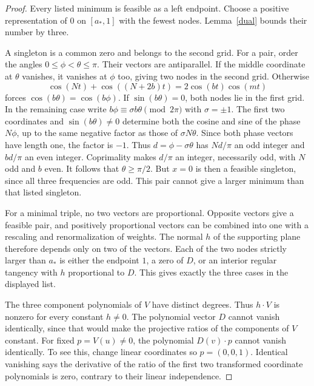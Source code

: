 \documentclass[10pt]{article}
\begin{document}
\begin{proof}
Every listed minimum is feasible as a left endpoint. Choose a positive representation of $0$ on $[a_*,1]$ with the fewest nodes. Lemma~\ref{dual} bounds their number by three.

A singleton is a common zero and belongs to the second grid. For a pair, order the angles $0\le\phi<\theta\le\pi$. Their vectors are antiparallel. If the middle coordinate at $\theta$ vanishes, it vanishes at $\phi$ too, giving two nodes in the second grid. Otherwise
\[
 \cos(Nt)+\cos((N+2b)t)=2\cos(bt)\cos(mt)
\]
forces $\cos(b\theta)=\cos(b\phi)$. If $\sin(b\theta)=0$, both nodes lie in the first grid. In the remaining case write $b\phi\equiv\sigma b\theta\pmod{2\pi}$ with $\sigma=\pm1$. The first two coordinates and $\sin(b\theta)\ne0$ determine both the cosine and sine of the phase $N\phi$, up to the same negative factor as those of $\sigma N\theta$. Since both phase vectors have length one, the factor is $-1$. Thus $d=\phi-\sigma\theta$ has $Nd/\pi$ an odd integer and $bd/\pi$ an even integer. Coprimality makes $d/\pi$ an integer, necessarily odd, with $N$ odd and $b$ even. It follows that $\theta\ge\pi/2$. But $x=0$ is then a feasible singleton, since all three frequencies are odd. This pair cannot give a larger minimum than that listed singleton.

For a minimal triple, no two vectors are proportional. Opposite vectors give a feasible pair, and positively proportional vectors can be combined into one with a rescaling and renormalization of weights. The normal $h$ of the supporting plane therefore depends only on two of the vectors. Each of the two nodes strictly larger than $a_*$ is either the endpoint $1$, a zero of $D$, or an interior regular tangency with $h$ proportional to $D$. This gives exactly the three cases in the displayed list.

The three component polynomials of $V$ have distinct degrees. Thus $h\cdot V$ is nonzero for every constant $h\ne0$. The polynomial vector $D$ cannot vanish identically, since that would make the projective ratios of the components of $V$ constant. For fixed $p=V(u)\ne0$, the polynomial $D(v)\cdot p$ cannot vanish identically. To see this, change linear coordinates so $p=(0,0,1)$. Identical vanishing says the derivative of the ratio of the first two transformed coordinate polynomials is zero, contrary to their linear independence.


\end{proof}
\end{document}
